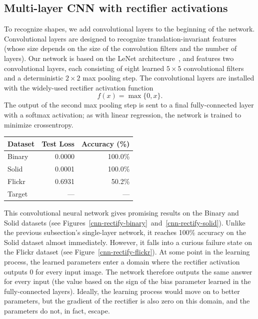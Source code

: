 \documentclass{article}
\newcommand{\dataset}[1]{\textsf{#1}}
\begin{document}
  \subsection{Multi-layer CNN with rectifier activations}

    To recognize shapes, we add convolutional layers to the beginning of the network. Convolutional layers are designed to recognize translation-invariant features (whose size depends on the size of the convolution filters and the number of layers). Our network is based on the LeNet architecture~\cite{lenet}, and features two convolutional layers, each consisting of eight learned $5\times 5$ convolutional filters and a deterministic $2\times 2$ max pooling step. The convolutional layers are installed with the widely-used rectifier activation function
    \[ f(x) = \max \{0, x\}. \]
    The output of the second max pooling step is sent to a final fully-connected layer with a softmax activation; as with linear regression, the network is trained to minimize crossentropy.

    \begin{table}[h]
      \centering
      \begin{tabular}{lrr}\toprule
        \textbf{Dataset} & \textbf{Test Loss} & \textbf{Accuracy (\%)}\\\midrule
        \dataset{Binary} & 0.0000 & 100.0\% \\ %
        \dataset{Solid}  & 0.0001 & 100.0\% \\ %
        \dataset{Flickr} & 0.6931 &  50.2\% \\ %
        \dataset{Target} &    --- &     --- \\ \bottomrule
      \end{tabular}
    \end{table}

    This convolutional neural network gives promising results on the \dataset{Binary} and \dataset{Solid} datasets (see Figures~\ref{cnn-rectify-binary}~and~\ref{cnn-rectify-solid}). Unlike the previous subsection's single-layer network, it reaches 100\% accuracy on the \dataset{Solid} dataset almost immediately. However, it falls into a curious failure state on the \dataset{Flickr} dataset (see Figure~\ref{cnn-rectify-flickr}). At some point in the learning process, the learned parameters enter a domain where the rectifier activation outputs $0$ for every input image. The network therefore outputs the same answer for every input (the value based on the sign of the bias parameter learned in the fully-connected layers). Ideally, the learning process would move on to better parameters, but the gradient of the rectifier is also zero on this domain, and the parameters do not, in fact, escape.
\end{document}
